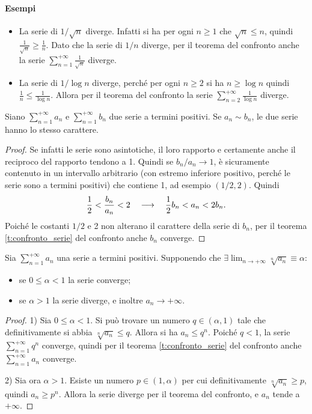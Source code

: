 \paragraph{Esempi}
\begin{itemize}
\item La serie di $1/\sqrt{n}$ diverge. Infatti si ha per ogni $n\geq 1$ che $\sqrt{n}\leq n$, quindi $\frac1{\sqrt{n}}\geq\frac1{n}$. Dato che la serie di $1/n$ diverge, per il teorema del confronto anche la serie $\sum_{n=1}^{+\infty}\frac1{\sqrt{n}}$ diverge.
\item La serie di $1/\log n$ diverge, perché per ogni $n\geq 2$ si ha $n\geq\log n$ quindi $\frac1{n}\leq\frac1{\log n}$. Allora per il teorema del confronto la serie $\sum_{n=2}^{+\infty}\frac1{\log n}$ diverge.
\end{itemize}
\begin{corollario}
\label{c:confronto_asintotico}
Siano $\sum_{n=1}^{+\infty}a_n$ e $\sum_{n=1}^{+\infty}b_n$ due serie a termini positivi. Se $a_n\sim b_n$, le due serie hanno lo stesso carattere.
\begin{proof}
Se infatti le serie sono asintotiche, il loro rapporto e certamente anche il reciproco del rapporto tendono a 1. Quindi se $b_n/a_n\to 1$, è sicuramente contenuto in un intervallo arbitrario (con estremo inferiore positivo, perché le serie sono a termini positivi) che contiene 1, ad esempio $(1/2,2)$. Quindi
\[
\frac12<\frac{b_n}{a_n}<2\quad\longrightarrow\quad\frac12b_n<a_n<2b_n.
\]
Poiché le costanti $1/2$ e 2 non alterano il carattere della serie di $b_n$, per il teorema \ref{t:confronto_serie} del confronto anche $b_n$ converge.
\end{proof}
\end{corollario}
\begin{teorema}
\label{t:criterio_radice_serie}
Sia $\sum_{n=1}^{+\infty}a_n$ una serie a termini positivi. Supponendo che $\exists\lim_{n\to+\infty}\sqrt[n]{a_n}\equiv\alpha$:
\begin{itemize}
\item se $0\leq\alpha<1$ la serie converge;
\item se $\alpha>1$ la serie diverge, e inoltre $a_n\to+\infty$.
\end{itemize}
\end{teorema}
\begin{proof}
1) Sia $0\leq\alpha<1$. Si può trovare un numero $q\in(\alpha,1)$ tale che definitivamente si abbia $\sqrt[n]{a_n}\leq q$. Allora si ha $a_n\leq q^n$. Poiché $q<1$, la serie $\sum_{n=1}^{+\infty}q^n$ converge, quindi per il teorema \ref{t:confronto_serie} del confronto anche $\sum_{n=1}^{+\infty}a_n$ converge.

2) Sia ora $\alpha>1$. Esiste un numero $p\in(1,\alpha)$ per cui definitivamente $\sqrt[n]{a_n}\geq p$, quindi $a_n\geq p^n$. Allora la serie diverge per il teorema del confronto, e $a_n$ tende a $+\infty$.
\end{proof}
